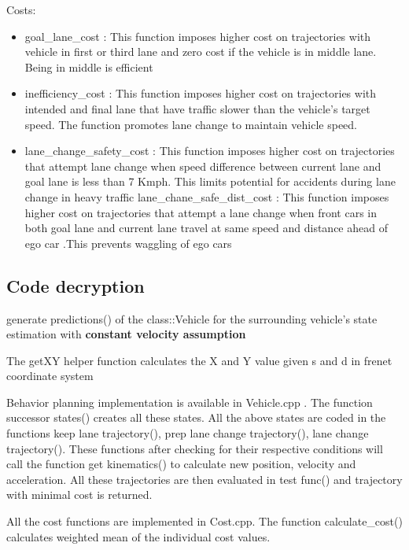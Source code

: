 \documentclass{article}
\begin{document}
    Costs:
    \begin{itemize}
    \item goal\_lane\_cost : This function imposes higher cost on trajectories with vehicle in first or third lane and zero cost if the vehicle is in middle lane. Being in middle is efficient
    \item inefficiency\_cost : This function imposes higher cost on trajectories with intended and final lane that have traffic slower than the vehicle’s target speed. The function promotes lane change to maintain vehicle speed.
    \item lane\_change\_safety\_cost : This function imposes higher cost on trajectories that attempt lane change when speed difference between current lane and goal lane is less than 7 Kmph. This limits potential for accidents during lane change in heavy traffic
    lane\_chane\_safe\_dist\_cost : This function imposes higher cost on trajectories that attempt a lane change when front cars in both goal lane and current lane travel at same speed and distance ahead of ego car .This prevents waggling of ego cars
    \end{itemize}
    
  \subsection{Code decryption}
  generate predictions() of the class::Vehicle for the surrounding vehicle's state estimation with \textbf{constant velocity assumption} 
  
  The getXY helper function calculates the X and Y value given s and d in frenet coordinate system
  
  Behavior planning implementation is available in Vehicle.cpp . The function successor states() creates all these states. All the above states are coded in the functions keep lane trajectory(), prep lane change trajectory(), lane change trajectory(). These functions after checking for their respective conditions will call the function get kinematics() to calculate new position, velocity and acceleration. All these trajectories are then evaluated in test func() and trajectory with minimal cost is returned.
  
  All the cost functions are implemented in Cost.cpp. The function calculate\_cost() calculates weighted mean of the individual cost values.
  
\end{document}
